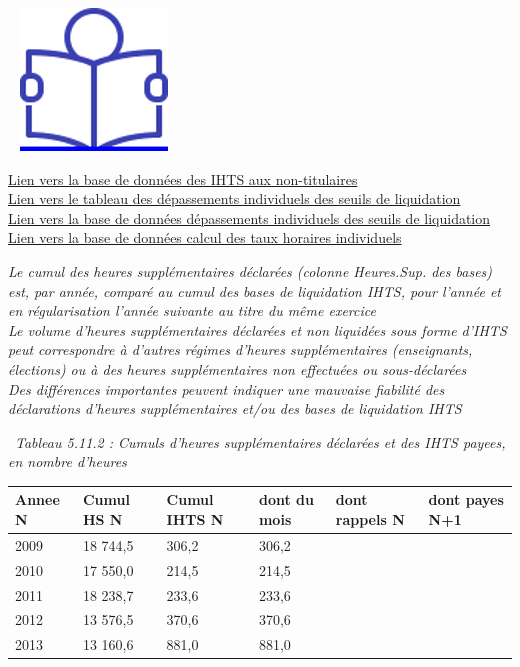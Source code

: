 ~
\href{../Docs/Notices/fiche_liquidation_IHTS.odt}{\includegraphics{icones/Notice.png}}

\href{../Bases/Reglementation/Base.IHTS.non.tit.csv}{Lien vers la base de
données des IHTS aux non-titulaires}\\
\href{../Bases/Reglementation/depassement.agent.annee.csv}{Lien vers le
tableau des dépassements individuels des seuils de liquidation}\\
\href{../Bases/Reglementation/depassement.agent.csv}{Lien vers la base de
données dépassements individuels des seuils de liquidation}\\
\href{../Bases/Reglementation/Taux.horaires.csv}{Lien vers la base de
données calcul des taux horaires individuels}

\emph{Le cumul des heures supplémentaires déclarées (colonne Heures.Sup.
des bases) est, par année, comparé au cumul des bases de liquidation
IHTS, pour l'année et en régularisation l'année suivante au titre du
même exercice}\\
\emph{Le volume d'heures supplémentaires déclarées et non liquidées sous
forme d'IHTS peut correspondre à d'autres régimes d'heures
supplémentaires (enseignants, élections) ou à des heures supplémentaires
non effectuées ou sous-déclarées}\\
\emph{Des différences importantes peuvent indiquer une mauvaise
fiabilité des déclarations d'heures supplémentaires et/ou des bases de
liquidation IHTS}

~\emph{Tableau 5.11.2 : Cumuls d'heures supplémentaires déclarées et des
IHTS payees, en nombre d'heures}

\begin{longtable}[]{@{}llllll@{}}
\toprule
Annee N & Cumul HS N & Cumul IHTS N & dont du mois & dont rappels N &
dont payes N+1\tabularnewline
\midrule
\endhead
2009 & 18 744,5 & 306,2 & 306,2 & &\tabularnewline
2010 & 17 550,0 & 214,5 & 214,5 & &\tabularnewline
2011 & 18 238,7 & 233,6 & 233,6 & &\tabularnewline
2012 & 13 576,5 & 370,6 & 370,6 & &\tabularnewline
2013 & 13 160,6 & 881,0 & 881,0 & &\tabularnewline
\bottomrule
\end{longtable}

